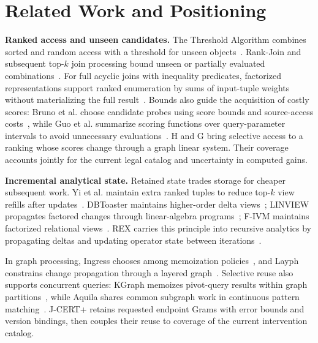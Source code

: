 \section{Related Work and Positioning}
\label{sec:related}

\textbf{Ranked access and unseen candidates.} The Threshold Algorithm combines sorted and random access with a threshold for unseen objects~\cite{fagin2001aggregation}. Rank-Join and subsequent top-$k$ join processing bound unseen or partially evaluated combinations~\cite{ilyas2003rankjoin,wu2010topkjoin}. For full acyclic joins with inequality predicates, factorized representations support ranked enumeration by sums of input-tuple weights without materializing the full result~\cite{tziavelis2021beyondequijoins}. Bounds also guide the acquisition of costly scores: Bruno et al. choose candidate probes using score bounds and source-access costs~\cite{bruno2002webtopk}, while Guo et al. summarize scoring functions over query-parameter intervals to avoid unnecessary evaluations~\cite{guo2008querydependent}. H and G bring selective access to a ranking whose scores change through a graph linear system. Their coverage accounts jointly for the current legal catalog and uncertainty in computed gains.

\textbf{Incremental analytical state.} Retained state trades storage for cheaper subsequent work. Yi et al. maintain extra ranked tuples to reduce top-$k$ view refills after updates~\cite{yi2003topkviews}. DBToaster maintains higher-order delta views~\cite{Koch_2014}; LINVIEW propagates factored changes through linear-algebra programs~\cite{Nikolic2014Linview}; F-IVM maintains factorized relational views~\cite{kara2024fivm}. REX carries this principle into recursive analytics by propagating deltas and updating operator state between iterations~\cite{mihaylov2012rex}.

In graph processing, Ingress chooses among memoization policies~\cite{gong2021ingress}, and Layph constrains change propagation through a layered graph~\cite{yu2023layph}. Selective reuse also supports concurrent queries: KGraph memoizes pivot-query results within graph partitions~\cite{gao2025kgraph}, while Aquila shares common subgraph work in continuous pattern matching~\cite{zou2025aquila}. J-CERT+ retains requested endpoint Grams with error bounds and version bindings, then couples their reuse to coverage of the current intervention catalog.

